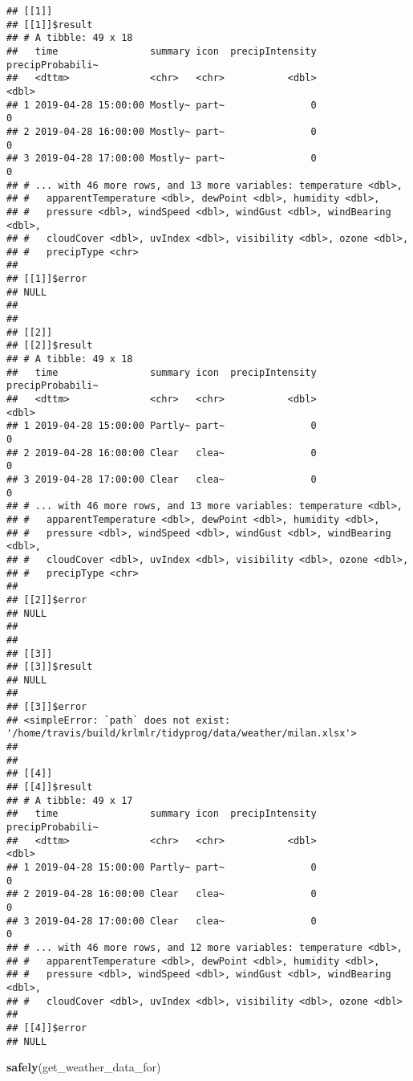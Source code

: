 \documentclass[]{book}
\newenvironment{Shaded}{\begin{snugshade}}{\end{snugshade}}
\newcommand{\KeywordTok}[1]{\textcolor[rgb]{0.13,0.29,0.53}{\textbf{#1}}}
\newcommand{\NormalTok}[1]{#1}
\begin{document}
\begin{verbatim}
## [[1]]
## [[1]]$result
## # A tibble: 49 x 18
##   time                summary icon  precipIntensity precipProbabili~
##   <dttm>              <chr>   <chr>           <dbl>            <dbl>
## 1 2019-04-28 15:00:00 Mostly~ part~               0                0
## 2 2019-04-28 16:00:00 Mostly~ part~               0                0
## 3 2019-04-28 17:00:00 Mostly~ part~               0                0
## # ... with 46 more rows, and 13 more variables: temperature <dbl>,
## #   apparentTemperature <dbl>, dewPoint <dbl>, humidity <dbl>,
## #   pressure <dbl>, windSpeed <dbl>, windGust <dbl>, windBearing <dbl>,
## #   cloudCover <dbl>, uvIndex <dbl>, visibility <dbl>, ozone <dbl>,
## #   precipType <chr>
## 
## [[1]]$error
## NULL
## 
## 
## [[2]]
## [[2]]$result
## # A tibble: 49 x 18
##   time                summary icon  precipIntensity precipProbabili~
##   <dttm>              <chr>   <chr>           <dbl>            <dbl>
## 1 2019-04-28 15:00:00 Partly~ part~               0                0
## 2 2019-04-28 16:00:00 Clear   clea~               0                0
## 3 2019-04-28 17:00:00 Clear   clea~               0                0
## # ... with 46 more rows, and 13 more variables: temperature <dbl>,
## #   apparentTemperature <dbl>, dewPoint <dbl>, humidity <dbl>,
## #   pressure <dbl>, windSpeed <dbl>, windGust <dbl>, windBearing <dbl>,
## #   cloudCover <dbl>, uvIndex <dbl>, visibility <dbl>, ozone <dbl>,
## #   precipType <chr>
## 
## [[2]]$error
## NULL
## 
## 
## [[3]]
## [[3]]$result
## NULL
## 
## [[3]]$error
## <simpleError: `path` does not exist: '/home/travis/build/krlmlr/tidyprog/data/weather/milan.xlsx'>
## 
## 
## [[4]]
## [[4]]$result
## # A tibble: 49 x 17
##   time                summary icon  precipIntensity precipProbabili~
##   <dttm>              <chr>   <chr>           <dbl>            <dbl>
## 1 2019-04-28 15:00:00 Partly~ part~               0                0
## 2 2019-04-28 16:00:00 Clear   clea~               0                0
## 3 2019-04-28 17:00:00 Clear   clea~               0                0
## # ... with 46 more rows, and 12 more variables: temperature <dbl>,
## #   apparentTemperature <dbl>, dewPoint <dbl>, humidity <dbl>,
## #   pressure <dbl>, windSpeed <dbl>, windGust <dbl>, windBearing <dbl>,
## #   cloudCover <dbl>, uvIndex <dbl>, visibility <dbl>, ozone <dbl>
## 
## [[4]]$error
## NULL
\end{verbatim}

\begin{Shaded}
\begin{Highlighting}[]
\KeywordTok{safely}\NormalTok{(get_weather_data_for)}
\end{Highlighting}
\end{Shaded}
\end{document}
